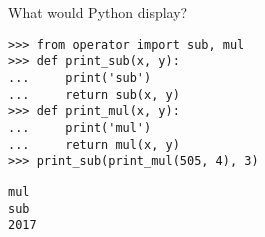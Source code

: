 
\begin{blocksection}
\question What would Python display?

\begin{lstlisting}
>>> from operator import sub, mul
>>> def print_sub(x, y):
...     print('sub')
...     return sub(x, y)
>>> def print_mul(x, y):
...     print('mul')
...     return mul(x, y)
>>> print_sub(print_mul(505, 4), 3)
\end{lstlisting}
\begin{solution}[1in]
\begin{lstlisting}
mul
sub
2017
\end{lstlisting}
\end{solution}
\end{blocksection}

